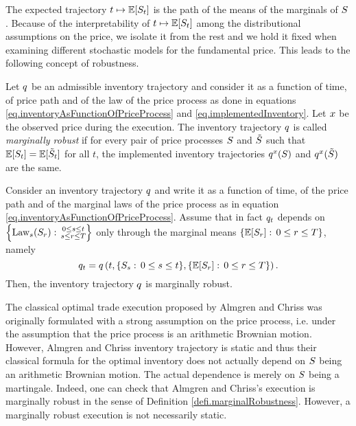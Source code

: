 \documentclass[10pt,a4paper]{article}
\begin{document}
The expected trajectory $t\mapsto \mathbb{{E}} [S_t]$ is the path of the means of the marginals of $S$. Because of the interpretability of $t\mapsto \mathbb{{E}} [S_t]$ among the distributional assumptions on the price, we isolate it from the rest and we hold it fixed when examining different stochastic models for the fundamental price. This leads to the following concept of robustness.
\begin{defi}\label{defi.marginalRobustness}
Let $q$ be an admissible  inventory trajectory and consider it as a function of time, of price path and of the law of the price process as done in equations \eqref{eq.inventoryAsFunctionOfPriceProcess} and \eqref{eq.implementedInventory}. Let $x$ be the observed price during the execution. The inventory trajectory $q$ is called \emph{marginally robust} if for every pair of price processes $S$ and $\tilde{S}$ such that $\mathbb{{E}} [S_t] = \mathbb{{E}}[\tilde{S}_t]$ for all $t$, the implemented inventory trajectories $q^{x}(S)$ and $q^{x}(\tilde{S})$ are the same. 
\end{defi}

\begin{prop}\label{prop.sufficientConditionMarginalRobustness}
Consider an inventory trajectory $q$ and write it as a function of time, of the price path and of the marginal laws of the price process as in equation \eqref{eq.inventoryAsFunctionOfPriceProcess}. Assume that in fact $q_t$ depends on $\left\lbrace \text{Law}_s (S_r): \, \substack{0\leq s \leq t \\s\leq r\leq T}\right \rbrace$ only through the marginal means $\lbrace \mathbb{{E}} [S_r]: \, 0\leq r\leq T \rbrace $, namely 
\begin{equation}\label{eq.sufficientConditionMarginalRobustness}
q_t = q \left(
t, \lbrace S_s: \, 0\leq s \leq t\rbrace, \lbrace \mathbb{{E}} [S_r]: \, 0\leq r\leq T \rbrace
\right). 
\end{equation}
Then, the inventory trajectory $q$ is marginally robust. 
\end{prop}

The classical optimal trade  execution proposed by Almgren and Chriss \cite{AC00opt} was originally formulated with a strong assumption on the price process, i.e. under the assumption that the price process is an arithmetic Brownian motion. However, Almgren and Chriss inventory trajectory is static and thus their classical formula for the optimal inventory does not actually depend on $S$ being an arithmetic Brownian motion. The actual dependence is merely on $S$ being a martingale. Indeed, one can check that Almgren and Chriss's execution is marginally robust in the sense of Definition \ref{defi.marginalRobustness}. However, a marginally robust execution is not necessarily static. 
\end{document}
